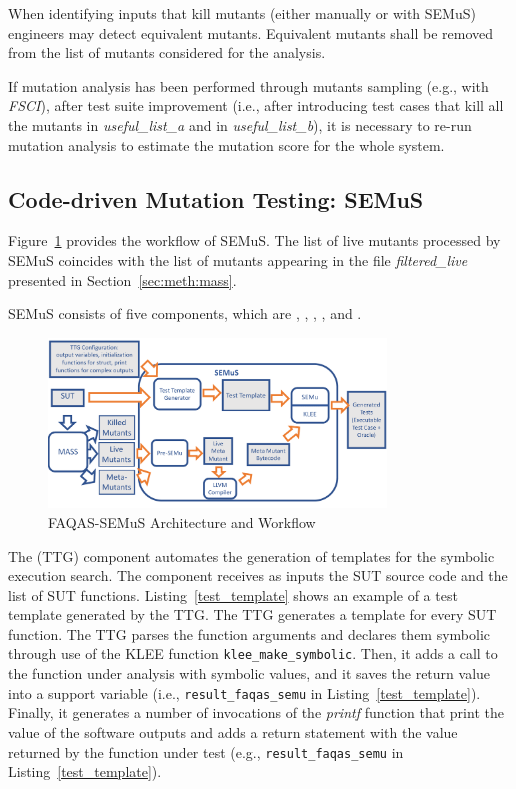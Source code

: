 {When identifying inputs that kill mutants (either manually or with SEMuS) engineers may detect equivalent mutants. Equivalent mutants shall be removed from the list of mutants considered for the analysis.

If mutation analysis has been performed through mutants sampling (e.g., with \emph{FSCI}), after test suite improvement (i.e., after introducing test cases that kill all the mutants in \emph{useful\_list\_a} and in \emph{useful\_list\_b}), it is necessary to re-run mutation analysis to estimate the mutation score for the whole system.

\clearpage

\subsection{Code-driven Mutation Testing: SEMuS}
\label{sec:meth:semus}

Figure~\ref{fig:semus_architecture} provides the workflow of SEMuS. The list of live mutants processed by SEMuS coincides with the list of mutants appearing in the file \emph{filtered\_live} presented in Section~\ref{sec:meth:mass}.

SEMuS consists of five components, which are ,  ,  ,  , and .

\begin{figure}[h]
\begin{center}
\includegraphics[width=0.8\textwidth]{images/semus-architecture2}
\caption{FAQAS-SEMuS Architecture and Workflow}
\label{fig:semus_architecture}
\end{center}
\end{figure}


The  (TTG) component automates the generation of templates for the symbolic execution search. The component receives as inputs the SUT source code and the list of SUT functions. 
Listing~\ref{test_template} shows an example of a test template generated by the TTG. The TTG generates a template for every SUT function. The TTG parses the function arguments and declares them symbolic through use of the KLEE function \texttt{klee\_make\_symbolic}. Then, it adds a call to the function under analysis with symbolic values, and it saves the return value into a support variable (i.e., \texttt{result\_faqas\_semu} in Listing~\ref{test_template}). Finally, it generates a number of invocations of the \emph{printf} function that print the value of the software outputs and adds a return statement with the value returned by the function under test (e.g., \texttt{result\_faqas\_semu} in Listing~\ref{test_template}). 


}
